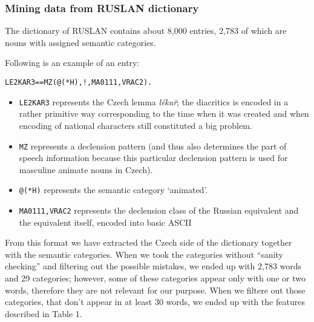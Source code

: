 \documentclass[letterpaper]{article}
\begin{document}
\subsubsection{Mining data from RUSLAN dictionary}

The dictionary of RUSLAN contains about 8,000 entries, 2,783 of which are nouns with assigned semantic categories.

Following is an example of an entry:

\begin{verbatim}
LE2KAR3==MZ(@(*H),!,MA0111,VRAC2).
\end{verbatim}

\begin{itemize}
\item \texttt{LE2KAR3} represents the Czech lemma \emph{l\'{e}ka\v{r}}; the diacritics is encoded in a rather primitive way corresponding to the time when it was created and when encoding of national characters still constituted a big problem.
\item \texttt{MZ} represents a declension pattern (and thus also determines the part of speech information because this particular declension pattern is used for masculine animate nouns in Czech).
\item \texttt{@(*H)} represents the semantic category `animated'.
\item \texttt{MA0111,VRAC2} represents the declension class of the Russian equivalent and the equivalent itself, encoded into basic ASCII
\end{itemize}

From this format we have extracted the Czech side of the dictionary together with the semantic categories. 
When we took the categories without ``sanity checking'' and filtering out the possible mistakes, 
we ended up with 2,783 words and 29 categories; however, some of these categories appear only with one or two words, therefore they are not relevant for our purpose. When we filtere out those categories, that don't appear in at least 30 words, we ended up with the features described in Table 1.
\end{document}
